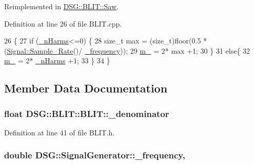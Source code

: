 Reimplemented in \hyperlink{classDSG_1_1BLIT_1_1Saw_a15d758814a8c32ef935667546f7fd08b}{D\-S\-G\-::\-B\-L\-I\-T\-::\-Saw}.



Definition at line 26 of file B\-L\-I\-T.\-cpp.


\begin{DoxyCode}
26                              \{
27     \textcolor{keywordflow}{if} (\hyperlink{classDSG_1_1BLIT_1_1BLIT_a487cca5adfe04a902c97aad8061c6c99}{\_nHarms}<=0) \{
28         \textcolor{keywordtype}{size\_t} max = (size\_t)floor(0.5 * (\hyperlink{namespaceDSG_1_1Signal_a87b4600622b1c53595ff95581fba2c4c}{Signal::Sample\_Rate}()/ 
      \hyperlink{classDSG_1_1SignalGenerator_a67e296e3506dcdf09402c667cddff9ac}{\_frequency}));
29         \hyperlink{classDSG_1_1BLIT_1_1BLIT_ac21b921cd1a9b2ec1d091ae8ed0502a2}{m\_} = 2* max +1;
30     \}
31     \textcolor{keywordflow}{else}\{
32         \hyperlink{classDSG_1_1BLIT_1_1BLIT_ac21b921cd1a9b2ec1d091ae8ed0502a2}{m\_} = 2* \hyperlink{classDSG_1_1BLIT_1_1BLIT_a487cca5adfe04a902c97aad8061c6c99}{\_nHarms} +1;
33     \}
34 \}\end{DoxyCode}


\subsection{Member Data Documentation}
\hypertarget{classDSG_1_1BLIT_1_1BLIT_aec52d8e6cca354ca19b3ea6b9bf02a9f}{
\subsubsection[{\-\_\-denominator}]{\setlength{\rightskip}{0pt plus 5cm}float D\-S\-G\-::\-B\-L\-I\-T\-::\-B\-L\-I\-T\-::\-\_\-denominator\hspace{0.3cm}{\ttfamily [protected]}}}\label{classDSG_1_1BLIT_1_1BLIT_aec52d8e6cca354ca19b3ea6b9bf02a9f}


Definition at line 41 of file B\-L\-I\-T.\-h.

\hypertarget{classDSG_1_1SignalGenerator_a67e296e3506dcdf09402c667cddff9ac}{
\subsubsection[{\-\_\-frequency}]{\setlength{\rightskip}{0pt plus 5cm}double D\-S\-G\-::\-Signal\-Generator\-::\-\_\-frequency\hspace{0.3cm}{\ttfamily [protected]}, {\ttfamily [inherited]}}}\label{classDSG_1_1SignalGenerator_a67e296e3506dcdf09402c667cddff9ac}


